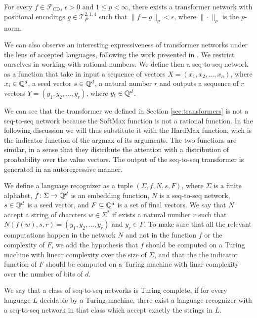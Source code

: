 \documentclass[]{marticle}
\begin{document}
\begin{block}[Theorem]
    For every $f\in\mathcal{F}_\text{CD}$, $\epsilon > 0$ and $1 \leq p < \infty$, there exists a
    transformer network with positional encodings $g\in \mathcal{T}^{2,1,4}_P$ such that 
    ${{\|f - g\|_p < \epsilon}}$, where $\|\cdot\|_p$ is the $p$-norm.
\end{block}

We can also observe an interesting expressiveness of transformer networks under the lens of accepted
languages, following the work presented in \cite{transformer-turing}. We restrict ourselves in
working with rational numbers. We define then a seq-to-seq network as a function that take in input
a sequence of vectors $X=(x_1, x_2, \dots, x_n)$, where $x_i\in\mathbb{Q}^d$, a seed vector $s\in\mathbb{Q}^d$, a
natural number $r$ and outputs a sequence of $r$ vectors $Y=(y_1, y_2, \dots, y_r)$, where
$y_i\in\mathbb{Q}^d$.

We can see that the transformer we defined in Section \ref{sec:transformers} is not a seq-to-seq
network because the SoftMax function is not a rational function. In the following discussion we will
thus substitute it with the HardMax function, wich is the indicator function of the argmax of its
arguments. The two functions are similar, in a sense that they distribute the attention with a
distribution of proabability over the value vectors. The output of the seq-to-seq transformer is
generated in an autoregressive manner.

We define a language recognizer as a tuple $(\Sigma, f, N, s, F)$, where $\Sigma$ is a finite
alphabet, $f\colon\Sigma\to\mathbb{Q}^d$ is an embedding function, $N$ is a seq-to-seq network, $s\in\mathbb{Q}^d$
is a seed vector, and $F\subseteq\mathbb{Q}^d$ is a set of final vectors. We say that $N$ accept a string of
charcters $w\in\Sigma^*$ if exists a natural number $r$ such that ${{N(f(w), s, r) = (y_1, y_2, \dots,
y_r)}}$ and $y_r\in F$. To make sure that all the relevant computations happen in the network $N$
and not in the function $f$ or the complexity of $F$, we add the hypothesis that $f$ should be
computed on a Turing machine with linear complexity over the size of $\Sigma$, and that the
the indicator function of $F$ should be computed on a Turing machine with linar complexity over the
number of bits of $d$.

We say that a class of seq-to-seq networks is Turing complete, if for every language $L$ decidable by a
Turing machine, there exist a language recognizer with a seq-to-seq network in that class which
accept exactly the strings in $L$.
\end{document}
